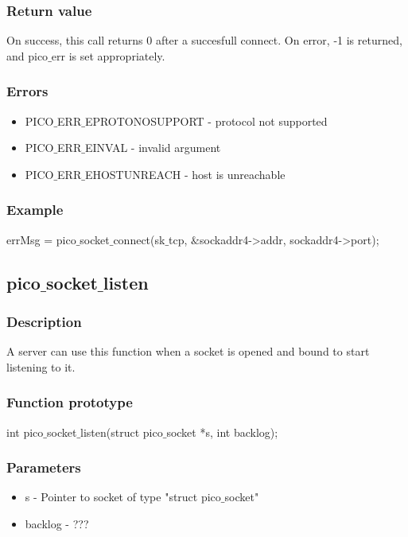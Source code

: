 \subsubsection*{Return value}
On success, this call returns 0 after a succesfull connect.
On error, -1 is returned, and pico$\_$err is set appropriately.

\subsubsection*{Errors}
\begin{itemize}
\item PICO$\_$ERR$\_$EPROTONOSUPPORT - protocol not supported
\item PICO$\_$ERR$\_$EINVAL - invalid argument
\item PICO$\_$ERR$\_$EHOSTUNREACH - host is unreachable 
\end{itemize}

\subsubsection*{Example}
errMsg = pico$\_$socket$\_$connect(sk$\_$tcp, $\&$sockaddr4->addr, sockaddr4->port);


\subsection{pico$\_$socket$\_$listen}

\subsubsection*{Description}
A server can use this function when a socket is opened and bound to start listening to it.

\subsubsection*{Function prototype}
int pico$\_$socket$\_$listen(struct pico$\_$socket *s, int backlog);

\subsubsection*{Parameters}
\begin{itemize}
\item s - Pointer to socket of type "struct pico$\_$socket"
\item backlog - ???
\end{itemize}

